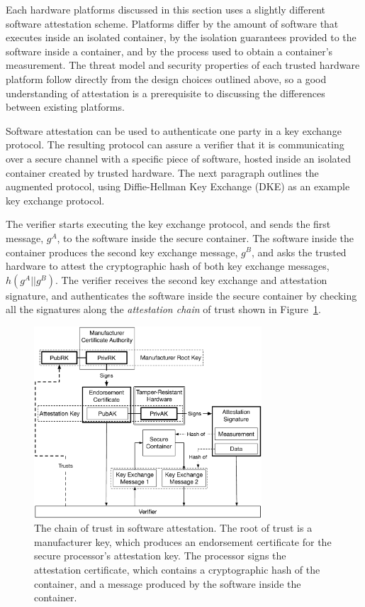 Each hardware platforms discussed in this section uses a slightly different
software attestation scheme. Platforms differ by the amount of software that
executes inside an isolated container, by the isolation guarantees provided to
the software inside a container, and by the process used to obtain a
container's measurement. The threat model and security properties of each
trusted hardware platform follow directly from the design choices outlined
above, so a good understanding of attestation is a prerequisite to discussing
the differences between existing platforms.

Software attestation can be used to authenticate one party in a key exchange
protocol. The resulting protocol can assure a verifier that it is communicating
over a secure channel with a specific piece of software, hosted inside an
isolated container created by trusted hardware. The next paragraph outlines the
augmented protocol, using Diffie-Hellman Key Exchange (DKE)
\cite{diffie1976keyexchange} as an example key exchange protocol.

The verifier starts executing the key exchange protocol, and sends the first
message, $g^{A}$, to the software inside the secure container. The software
inside the container produces the second key exchange message, $g^{B}$, and
asks the trusted hardware to attest the cryptographic hash of both key exchange
messages, $h(g^{A} || g^{B})$. The verifier receives the second key exchange
and attestation signature, and authenticates the software inside the secure
container by checking all the signatures along the \textit{attestation chain}
of trust shown in Figure~\ref{fig:generic_attestation_chain}.

\begin{figure}[hbt]
  \centering
  \includegraphics[width=85mm]{figures/generic_attestation_chain.pdf}
  \caption{
    The chain of trust in software attestation. The root of trust is a
    manufacturer key, which produces an endorsement certificate for the secure
    processor's attestation key. The processor signs the attestation
    certificate, which contains a cryptographic hash of the container, and a
    message produced by the software inside the container.
  }
  \label{fig:generic_attestation_chain}
\end{figure}

